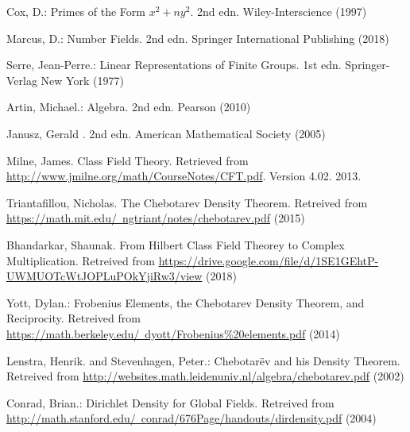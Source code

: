\documentclass{article}
\theoremstyle{plain}
\theoremstyle{definition}
\theoremstyle{remark}
\numberwithin{equation}{section}
\numberwithin{thm}{section}
\begin{document}
\begin{thebibliography}{1}

Cox, D.: Primes of the Form $x^2 + ny^2$. 2nd edn. Wiley-Interscience (1997)

Marcus, D.: Number Fields. 2nd edn. Springer International Publishing (2018)

Serre, Jean-Perre.: Linear Representations of Finite Groups. 1st edn. Springer-Verlag New York (1977)

Artin, Michael.: Algebra. 2nd edn. Pearson (2010)

Janusz, Gerald . 2nd edn. American Mathematical Society (2005)

Milne, James. Class Field Theory. Retrieved from
\href{http://www.jmilne.org/math/CourseNotes/CFT.pdf}{http://www.jmilne.org/math/CourseNotes/CFT.pdf}. Version 4.02. 2013.

Triantafillou, Nicholas. The Chebotarev Density Theorem. Retreived from \href{https://math.mit.edu/~ngtriant/notes/chebotarev.pdf}{https://math.mit.edu/~ngtriant/notes/chebotarev.pdf} (2015)

Bhandarkar, Shaunak. From Hilbert Class Field Theorey to Complex Multiplication. Retreived from \href{https://drive.google.com/file/d/1SE1GEhtP-UWMUOTcWtJOPLuPOkYjiRw3/view}{https://drive.google.com/file/d/1SE1GEhtP-UWMUOTcWtJOPLuPOkYjiRw3/view} (2018)

Yott, Dylan.: Frobenius Elements, the Chebotarev Density Theorem, and Reciprocity. Retreived from \href{https://math.berkeley.edu/~dyott/Frobenius\%20elements.pdf}{https://math.berkeley.edu/~dyott/Frobenius\%20elements.pdf} (2014)

Lenstra, Henrik. and Stevenhagen, Peter.: Chebotarëv and his Density Theorem. Retreived from \href{http://websites.math.leidenuniv.nl/algebra/chebotarev.pdf}{http://websites.math.leidenuniv.nl/algebra/chebotarev.pdf} (2002)

Conrad, Brian.: Dirichlet Density for Global Fields. Retreived from \href{http://math.stanford.edu/~conrad/676Page/handouts/dirdensity.pdf}{http://math.stanford.edu/~conrad/676Page/handouts/dirdensity.pdf} (2004)

\end{thebibliography}
\end{document}
